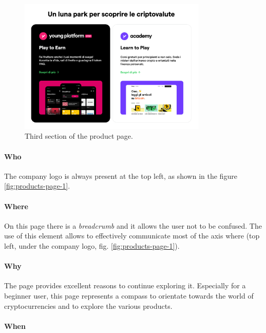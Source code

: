 \begin{figure}[H]
  \centering
  \includegraphics[width=0.80\textwidth]{res/images/internal-pages/products-page/products-page-3.png}
  \caption{Third section of the product page.}
  \label{fig:products-page-3}
\end{figure}

\paragraph{Who}

The company logo is always present at the top left, as shown in the figure 
\ref{fig:products-page-1}.

\paragraph{Where}

On this page there is a \textit{breadcrumb} and it allows the user not to 
be confused. The use of this element allows to effectively communicate most 
of the axis where (top left, under the company logo, fig. 
\ref{fig:products-page-1}).

\paragraph{Why}

The page provides excellent reasons to continue exploring it. Especially 
for a beginner user, this page represents a compass to orientate towards 
the world of cryptocurrencies and to explore the various products.

\paragraph{When}

